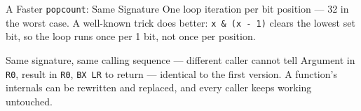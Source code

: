 \documentclass[9pt,aspectratio=169,xcolor=table]{beamer}
\begin{document}
\begin{frame}[fragile]{A Faster \texttt{popcount}: Same Signature}
    \leavevmode
    {\small One loop iteration per \alert{bit position} --- 32 in the worst
    case. A well-known trick does better: \texttt{x \& (x - 1)} clears the
    \alert{lowest set bit}, so the loop runs once per 1 bit, not once per
    position.}

    \vspace{1mm}

\begin{block}{Same signature, same calling sequence --- different caller cannot tell}
    Argument in \texttt{R0}, result in \texttt{R0}, \texttt{BX LR} to return
    --- identical to the first version. A function's internals can be
    rewritten and replaced, and every caller keeps working untouched.
\end{block}
\end{frame}
\end{document}
